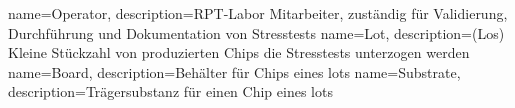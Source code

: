 {
    name=Operator,
    description={RPT-Labor Mitarbeiter, zuständig für Validierung, Durchführung und Dokumentation von Stresstests}
}
{
    name=Lot,
    description={(Los) Kleine Stückzahl von produzierten Chips die Stresstests unterzogen werden}
}
{
    name=Board,
    description={Behälter für Chips eines \glspl{lot}}
}
{
    name=Substrate,
    description={Trägersubstanz für einen Chip eines \glspl{lot}}
}




